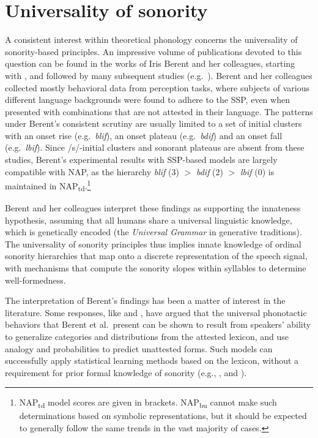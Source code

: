 \section{Universality of sonority}\label{sec:projection}

A consistent interest within theoretical phonology concerns the universality of sonority-based principles. An impressive volume of publications devoted to this question can be found in the works of Iris Berent and her colleagues, starting with \citet{berent2007we}, and followed by many subsequent studies (e.g.~\citealt{berent2008language, berent2015role, berent2012language, berent2012universalsk, berent2011syllable, berent2014languagesk, berent2013phnological, berent2017origins, gomez2014language, lennertz2015onthesonority, zhao2015universalsk}). Berent and her colleagues collected mostly behavioral data from perception tasks, where subjects of various different language backgrounds were found to adhere to the SSP, even when presented with combinations that are not attested in their language. The patterns under Berent's consistent scrutiny are usually limited to a set of initial clusters with an onset rise (e.g.~\emph{blif}), an onset plateau (e.g.~\emph{bdif}) and an onset fall (e.g.~\emph{lbif}). Since /s/-initial clusters and sonorant plateaus are absent from these studies, Berent's experimental results with SSP-based models are largely compatible with NAP, as the hierarchy \emph{blif} (3) \(>\) \emph{bdif} (2) \(>\) \emph{lbif} (0) is maintained in NAP\textsubscript{td}.\footnote{NAP\textsubscript{td} model scores are given in brackets. NAP\textsubscript{bu} cannot make such determinations based on symbolic representations, but it should be expected to generally follow the same trends in the vast majority of cases.}

Berent and her colleagues interpret these findings as supporting the innateness hypothesis, assuming that all humans share a universal linguistic knowledge, which is genetically encoded (the \emph{Universal Grammar} in generative traditions).
The universality of sonority principles thus implies innate knowledge of ordinal sonority hierarchies that map onto a discrete representation of the speech signal, with mechanisms that compute the sonority slopes within syllables to determine well-formedness.

The interpretation of Berent's findings has been a matter of interest in the literature. Some responses, like \citet{daland2011explaining} and \citet{hayes2011interpreting}, have argued that the universal phonotactic behaviors that Berent et al.~present can be shown to result from speakers' ability to generalize categories and distributions from the attested lexicon, and use analogy and probabilities to predict unattested forms.
Such models can successfully apply statistical learning methods based on the lexicon, without a requirement for prior formal knowledge of sonority (e.g., \citealt{jurafsky2009speech, albright2009feature, bailey2001determinants, coleman1997stochastic, futrell2017generative, hayes2011interpreting, hayes2008maximum, jarosz2017inputsk, mayer2019phonotacticsk, vitevitch2004webbasedsk}, and \citealt{mirea2019usingsk}).

